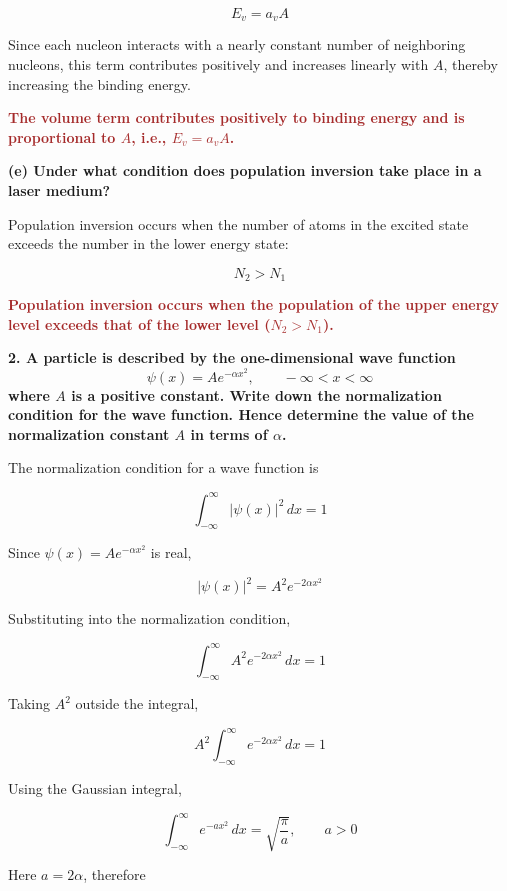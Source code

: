 \documentclass[a4paper, 12pt]{article}
\begin{document}
\[
E_v = a_v A
\]

Since each nucleon interacts with a nearly constant number of neighboring nucleons, this term contributes positively and increases linearly with $A$, thereby increasing the binding energy.

\textbf{\textcolor{brown}{\textbf{The volume term contributes positively to binding energy and is proportional to $A$, i.e., $E_v = a_v A$.}}}

\vspace{0.5cm}

\textbf{(e) Under what condition does population inversion take place in a laser medium?}

Population inversion occurs when the number of atoms in the excited state exceeds the number in the lower energy state:

\[
N_2 > N_1
\]

\textbf{\textcolor{brown}{\textbf{Population inversion occurs when the population of the upper energy level exceeds that of the lower level ($N_2 > N_1$).}}}




\textbf{2. A particle is described by the one-dimensional wave function}
\[
\psi(x) = A e^{-\alpha x^{2}}, \qquad -\infty < x < \infty
\]
\textbf{where $A$ is a positive constant. Write down the normalization condition for the wave function. Hence determine the value of the normalization constant $A$ in terms of $\alpha$.}

\vspace{0.3cm}

The normalization condition for a wave function is

\[
\int_{-\infty}^{\infty} |\psi(x)|^{2} \, dx = 1
\]

Since $\psi(x) = A e^{-\alpha x^{2}}$ is real,

\[
|\psi(x)|^{2} = A^{2} e^{-2\alpha x^{2}}
\]

Substituting into the normalization condition,

\[
\int_{-\infty}^{\infty} A^{2} e^{-2\alpha x^{2}} \, dx = 1
\]

Taking $A^{2}$ outside the integral,

\[
A^{2} \int_{-\infty}^{\infty} e^{-2\alpha x^{2}} \, dx = 1
\]

Using the Gaussian integral,

\[
\int_{-\infty}^{\infty} e^{-a x^{2}} \, dx = \sqrt{\frac{\pi}{a}}, \qquad a > 0
\]

Here $a = 2\alpha$, therefore
\end{document}
